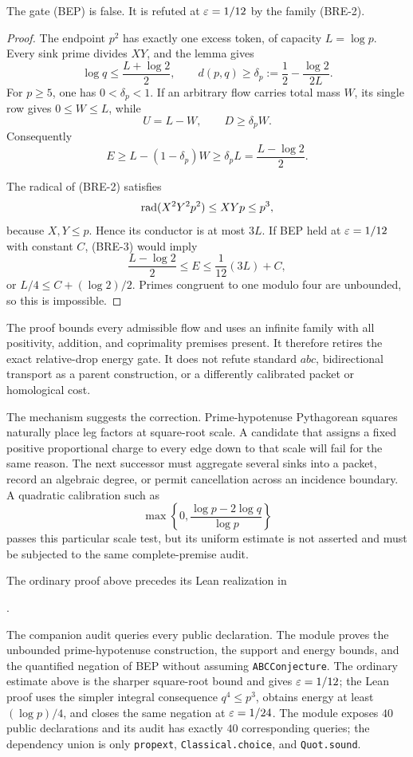 \begin{theorem}
\label{thm:bidirectional-relative-drop-obstruction}
The gate \textup{(BEP)} is false.  It is refuted at $\varepsilon=1/12$ by the
family \textup{(BRE-2)}.
\end{theorem}

\begin{proof}
The endpoint $p^2$ has exactly one excess token, of capacity
$L=\log p$.  Every sink prime divides $XY$, and the lemma gives
\[
 \log q\le\frac{L+\log2}{2},\qquad
 d(p,q)\ge\delta_p:=\frac12-\frac{\log2}{2L}.
\]
For $p\ge5$, one has $0<\delta_p<1$.  If an arbitrary flow carries total
mass $W$, its single row gives $0\le W\le L$, while
\[
 U=L-W,\qquad D\ge\delta_pW.
\]
Consequently
\[
 E\ge L-(1-\delta_p)W
 \ge\delta_pL=\frac{L-\log2}{2}.
\tag{BRE-3}
\]

The radical of (BRE-2) satisfies
\[
 \operatorname{rad}(X^2Y^2p^2)\le XYp\le p^3,
\]
because $X,Y\le p$.  Hence its conductor is at most $3L$.  If BEP held at
$\varepsilon=1/12$ with constant $C$, (BRE-3) would imply
\[
 \frac{L-\log2}{2}
 \le E\le\frac1{12}(3L)+C,
\]
or $L/4\le C+(\log2)/2$.  Primes congruent to one modulo four are unbounded,
so this is impossible.
\end{proof}

The proof bounds every admissible flow and uses an infinite family with all
positivity, addition, and coprimality premises present.  It therefore retires
the exact relative-drop energy gate.  It does not refute standard $abc$,
bidirectional transport as a parent construction, or a differently calibrated
packet or homological cost.

The mechanism suggests the correction.  Prime-hypotenuse Pythagorean squares
naturally place leg factors at square-root scale.  A candidate that assigns a
fixed positive proportional charge to every edge down to that scale will fail
for the same reason.  The next successor must aggregate several sinks into a
packet, record an algebraic degree, or permit cancellation across an incidence
boundary.  A quadratic calibration such as
\[
 \max\left\{0,\frac{\log p-2\log q}{\log p}\right\}
\]
passes this particular scale test, but its uniform estimate is not asserted
and must be subjected to the same complete-premise audit.

The ordinary proof above precedes its Lean realization in
\begin{center}
.
\end{center}
The companion audit queries every public declaration.  The module proves the
unbounded prime-hypotenuse construction, the support and energy bounds, and
the quantified negation of BEP without assuming \texttt{ABCConjecture}.  The
ordinary estimate above is the sharper square-root bound and gives
$\varepsilon=1/12$; the Lean proof uses the simpler integral consequence
$q^4\le p^3$, obtains energy at least $(\log p)/4$, and closes the same
negation at $\varepsilon=1/24$.  The module exposes $40$ public declarations and its
audit has exactly $40$ corresponding queries; the dependency union is only
\texttt{propext}, \texttt{Classical.choice}, and \texttt{Quot.sound}.
